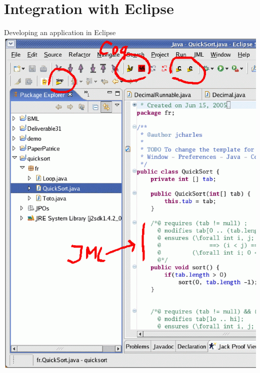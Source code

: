 \documentclass[final,nocolorBG,a4,mobius,nototal,pdf,slideColor]{prosper}
\begin{document}
\part{Integration with Eclipse}
\begin{slide}{Developing an application in Eclipse}
\vspace*{-1.5em}
\includegraphics[height=\textheight]{screen1.ps}
\end{slide}
\end{document}
